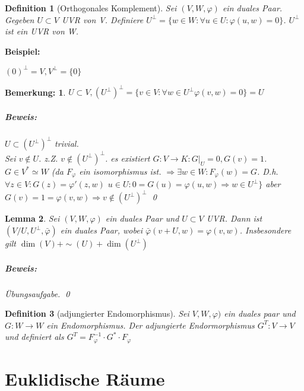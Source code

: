 \documentclass{report}
\newenvironment{beispiel} {
\textbf{Beispiel:}\hfill\break
}{}
\theoremstyle{customrem}
\newtheorem*{bemerkung}{Bemerkung\textnormal:}
\theoremstyle{customdef}
\newtheorem{definition}{Definition}[chapter]
\newtheorem{lemma}[definition]{Lemma}
\renewenvironment{proof}{\paragraph{Beweis: }}{\qed}
\theoremstyle{customenv}
\begin{document}
\begin{definition}[Orthogonales Komplement]
  Sei \((V, W, \varphi)\) ein duales Paar. Gegeben \(U \subset V\) UVR
  von V. Definiere \(
  U^{\bot} = \{w \in W : \forall u \in U : \varphi(u, w) = 0 \}
  \). \(U^\bot\) ist ein UVR von W.
\end{definition}

\begin{beispiel}
  \((0)^\bot = V, V^\bot = \{0\}\)
\end{beispiel}

\begin{bemerkung}
  \(U \subset V,
  (U^\bot)^\bot = \{v \in V : \forall w \in U^\bot \varphi(v, w) = 0\} = U\)
  \begin{proof}
    \(U \subset (U^\bot)^\bot\) trivial.\\
    Sei \(v \not\in U\). z.Z. \(v \not\in (U^\bot)^\bot\).
    es existiert \(G : V \to K : G|_U = 0, G(v) = 1\). \(G \in V^* \simeq W\)
    (da \(F_{\varphi}\) ein isomorphismus ist. \(\Rightarrow \exists w \in W
    : F_{\varphi}(w) = G\). D.h. \(\forall z \in V : G(z) = \varphi'(z, w)\)
    \(u \in U : 0 = G(u) = \varphi(u, w) \Rightarrow w \in U^\bot\}\) aber
    \(G(v) = 1 = \varphi(v, w) \Rightarrow v \not\in (U^\bot)^\bot\)
  \end{proof}
\end{bemerkung}

\begin{lemma}
  Sei \((V, W, \varphi)\) ein duales Paar und \(U \subset V\) UVR. Dann ist
  \((V /U, U^\bot, \bar\varphi)\) ein duales Paar, wobei
  \(\bar\varphi (v+U, w) = \varphi(v, w)\). Insbesondere gilt
  \(\dim(V) + \sim(U) + \dim(U^\bot)\)
  \begin{proof}
    \"Ubungsaufgabe.
  \end{proof}
\end{lemma}

\begin{definition}[adjungierter Endomorphismus]
  Sei \(V, W, \varphi)\) ein duales paar und \(G : W \to W\) ein Endomorphismus.
  Der adjungierte Endormorphismus \(G^T : V \to V\) und definiert als
  \(G^T = F^{-1}_{\varphi} \cdot G^* \cdot F_\varphi\)
\end{definition}

\chapter{Euklidische R\"aume}
\end{document}
